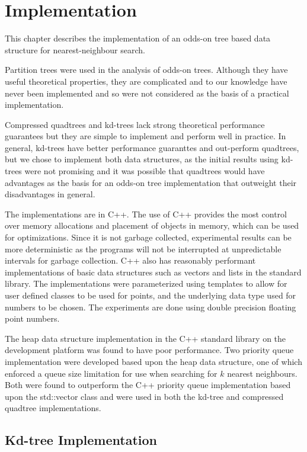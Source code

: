 \documentclass[mcs]{scsthesis}
\begin{document}
\chapter{Implementation}

This chapter describes the implementation of an odds-on tree based data
structure for nearest-neighbour search.

Partition trees were used in the analysis of odds-on trees. Although they have
useful theoretical properties, they are complicated and to our knowledge have
never been implemented and so were not considered as the basis of a practical
implementation.

Compressed quadtrees and kd-trees lack strong theoretical performance
guarantees but they are simple to implement and perform well in practice. In
general, kd-trees have better performance guaranttes and out-perform quadtrees,
but we chose to implement both data structures, as the initial results using
kd-trees were not promising and it was possible that quadtrees would have
advantages as the basis for an odds-on tree implementation that outweight their
disadvantages in general. 

The implementations are in C++. The use of C++ provides the most control over
memory allocations and placement of objects in memory, which can be used for
optimizations. Since it is not garbage collected, experimental results can be
more deterministic as the programs will not be interrupted at unpredictable
intervals for garbage collection. C++ also has reasonably performant
implementations of basic data structures such as vectors and lists in the
standard library. The implementations were parameterized using templates to
allow for user defined classes to be used for points, and the underlying data
type used for numbers to be chosen. The experiments are done using double
precision floating point numbers.

The heap data structure implementation in the C++ standard library on the
development platform was found to have poor performance. Two priority queue
implementation were developed based upon the heap data structure, one of which
enforced a queue size limitation for use when searching for \(k\) nearest
neighbours. Both were found to outperform the C++ priority queue implementation
based upon the std::vector class and were used in both the kd-tree and
compressed quadtree implementations.

\section{Kd-tree Implementation}
\end{document}
